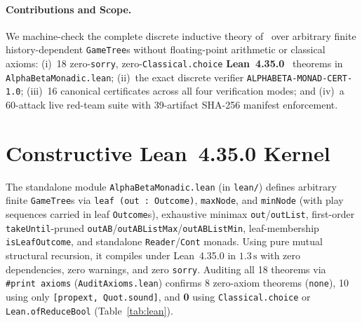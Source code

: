\documentclass[10pt,twocolumn]{article}
\begin{document}
\paragraph{Contributions and Scope.}
We machine-check the complete discrete inductive theory of~\cite{escardo2026alphabeta} over arbitrary finite history-dependent \texttt{GameTree}s without floating-point arithmetic or classical axioms:
(i)~18 zero-\texttt{sorry}, zero-\texttt{Classical.choice} \textbf{Lean~4.35.0}~\cite{demoura2021lean4} theorems in \texttt{AlphaBetaMonadic.lean};
(ii)~the exact discrete verifier \texttt{ALPHABETA-MONAD-CERT-1.0};
(iii)~16 canonical certificates across all four verification modes; and
(iv)~a 60-attack live red-team suite with 39-artifact SHA-256 manifest enforcement.

\section{Constructive Lean~4.35.0 Kernel}\label{sec:lean}
The standalone module \texttt{AlphaBetaMonadic.lean} (in \texttt{lean/}) defines arbitrary finite \texttt{GameTree}s via \texttt{leaf (out : Outcome)}, \texttt{maxNode}, and \texttt{minNode} (with play sequences carried in leaf \texttt{Outcome}s), exhaustive minimax \texttt{out}/\texttt{outList}, first-order \texttt{takeUntil}-pruned \texttt{outAB}/\texttt{outABListMax}/\texttt{outABListMin}, leaf-membership \texttt{isLeafOutcome}, and standalone \texttt{Reader}/\texttt{Cont} monads. Using pure mutual structural recursion, it compiles under Lean~4.35.0 in $1.3\,\mathrm{s}$ with zero dependencies, zero warnings, and zero \texttt{sorry}. Auditing all 18 theorems via \texttt{\#print axioms} (\texttt{AuditAxioms.lean}) confirms 8 zero-axiom theorems (\texttt{none}), 10 using only \texttt{[propext, Quot.sound]}, and \textbf{0} using \texttt{Classical.choice} or \texttt{Lean.ofReduceBool} (Table~\ref{tab:lean}).
\end{document}
